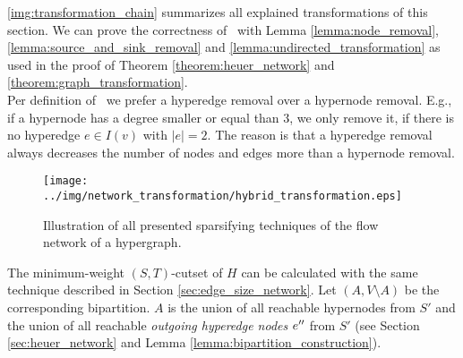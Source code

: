 \autoref{img:transformation_chain} summarizes all explained transformations of this section.
We can prove the correctness of \ShortHybrid~with Lemma \ref{lemma:node_removal}, \ref{lemma:source_and_sink_removal}
and \ref{lemma:undirected_transformation} as used in the proof of Theorem \ref{theorem:heuer_network}
and \ref{theorem:graph_transformation}. \\
Per definition of \ShortHybrid~we prefer a hyperedge removal over a hypernode removal. E.g., if
a hypernode has a degree smaller or equal than $3$, we only remove it, if there is no hyperedge
$e \in I(v)$ with $|e| = 2$. The reason is that a hyperedge removal always decreases the number of nodes
and edges more than a hypernode removal. \\
\begin{figure}[ht!]
\centering
\texttt{[image: ../img/network\_transformation/hybrid\_transformation.eps]}
\caption{Illustration of all presented sparsifying techniques of the flow network of a hypergraph.}
\label{img:transformation_chain}
\end{figure}
The minimum-weight $(S,T)$-cutset of $H$ can be calculated with the same technique described in Section
\ref{sec:edge_size_network}. Let $(A,V\setminus A)$ be the corresponding bipartition.
$A$ is the union of all reachable hypernodes from $S'$ and the union of
all reachable \emph{outgoing hyperedge nodes} $e''$ from $S'$ (see Section \ref{sec:heuer_network} 
and Lemma \ref{lemma:bipartition_construction}). 
